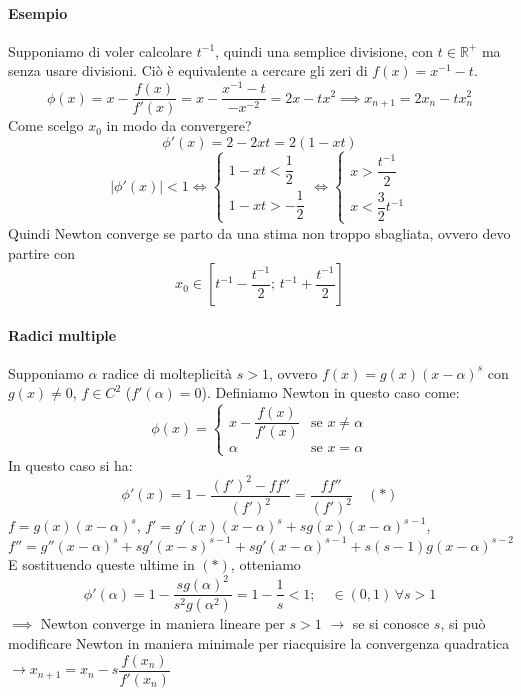 \documentclass[12pt,a4paper,]{report}
\begin{document}
\paragraph{Esempio}
Supponiamo di voler calcolare $t^{-1}$, quindi una semplice divisione, con $t \in \mathbb{R}^+$ ma senza usare divisioni. Ciò è equivalente a cercare gli zeri di $f(x) = x^{-1}-t$.
\[
\phi(x) = x - \frac{f(x)}{f'(x)} = x - \frac{x^{-1} - t}{-x^{-2}} = 2x - tx^2 \implies x_{n+1} = 2x_n - tx_n^2
\]
Come scelgo $x_0$ in modo da convergere?
\[
\phi'(x) = 2 - 2xt = 2(1 - xt)
\]
\[
|\phi'(x)| < 1 \iff
\begin{cases}
1 - xt < \dfrac{1}{2} \\
1 - xt > -\dfrac{1}{2}
\end{cases}
\iff
\begin{cases}
x > \dfrac{t^{-1}}{2} \\
x < \dfrac{3}{2}t^{-1}
\end{cases}
\]
Quindi Newton converge se parto da una stima non troppo sbagliata, ovvero devo partire con
\[
x_0 \in \left[t^{-1} - \frac{t^{-1}}{2};\, t^{-1} + \frac{t^{-1}}{2}\right]
\]

\paragraph{Radici multiple}
Supponiamo $\alpha$ radice di molteplicità $s > 1$, ovvero $f(x) = g(x)(x-\alpha)^s$ con $g(x) \neq 0$, $f \in C^2$ ($f'(\alpha) = 0$). Definiamo Newton in questo caso come:
\[
\phi(x) = \begin{cases}
x - \dfrac{f(x)}{f'(x)} & \text{se } x \neq \alpha \\
\alpha & \text{se } x = \alpha
\end{cases}
\]
In questo caso si ha:
\[
\phi'(x) = 1 - \frac{(f')^2 - ff''}{(f')^2} = \frac{ff''}{(f')^2} \quad (*)
\]
$f = g(x)(x-\alpha)^s$, $f' = g'(x)(x-\alpha)^s + sg(x)(x-\alpha)^{s-1}$, $f'' = g''(x-\alpha)^s + sg'(x-s)^{s-1} + sg'(x-\alpha)^{s-1} + s(s-1)g(x-\alpha)^{s-2}$\\
E sostituendo queste ultime in $(*)$, otteniamo
\[
\phi'(\alpha) = 1 - \frac{sg(\alpha)^2}{s^2g(\alpha^2)} = 1 - \frac{1}{s} < 1; \quad \in (0,1) \,\forall s > 1
\]
$\implies$ Newton converge in maniera lineare per $s > 1$
\noindent
$\to$ se si conosce $s$, si può modificare Newton in maniera minimale per riacquisire la convergenza quadratica $\to x_{n+1} = x_n - s\dfrac{f(x_n)}{f'(x_n)}$

\begin{lezione}
    [Lezione 21 13/05]
\end{lezione}
\end{document}
